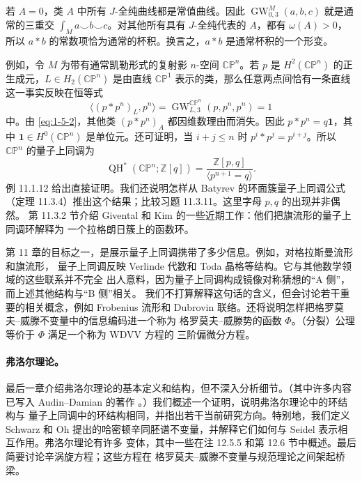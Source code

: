 若 $A=0$，类 $A$ 中所有 $J$-全纯曲线都是常值曲线。因此
$\operatorname{GW}_{0,3}^M(a,b,c)$ 就是通常的三重交
$\int_M a\smile b\smile c$。对其他所有具有 $J$-全纯代表的 $A$，都有 $\omega(A)>0$，
所以 $a*b$ 的常数项恰为通常的杯积。换言之，$a*b$ 是通常杯积的一个形变。

例如，令 $M$ 为带有通常凯勒形式的复射影 $n$-空间 $\mathbb{CP}^n$。若 $p$ 是
$H^2(\mathbb{CP}^n)$ 的正生成元，$L\in H_2(\mathbb{CP}^n)$ 是由直线
$\mathbb{CP}^1$ 表示的类，那么任意两点间恰有一条直线这一事实反映在恒等式
\[
  \bigl\langle(p*p^n)_L,p^n\bigr\rangle
  =\operatorname{GW}_{L,3}^{\mathbb{CP}^n}(p,p^n,p^n)=1
\]
中。由 \eqref{eq:1-5-2}，其他类 $(p*p^n)_A$ 都因维数理由而消失。因此
$p*p^n=q\mathbf1$，其中 $\mathbf1\in H^0(\mathbb{CP}^n)$ 是单位元。还可证明，当
$i+j\le n$ 时 $p^i*p^j=p^{i+j}$。所以 $\mathbb{CP}^n$ 的量子上同调为
\[
  \operatorname{QH}^*(\mathbb{CP}^n;\mathbb Z[q])
  =\frac{\mathbb Z[p,q]}{\langle p^{n+1}=q\rangle}.
\]
例 11.1.12 给出直接证明。我们还说明怎样从 Batyrev 的环面簇量子上同调公式
（定理 11.3.4）推出这个结果；比较习题 11.3.11。这里字母 $p,q$ 的出现并非偶然。
第 11.3.2 节介绍 Givental 和 Kim 的一些近期工作：他们把旗流形的量子上同调环解释为
一个拉格朗日簇上的函数环。

第 11 章的目标之一，是展示量子上同调携带了多少信息。例如，对格拉斯曼流形和旗流形，
量子上同调反映 Verlinde 代数和 Toda 晶格等结构。它与其他数学领域的这些联系并不完全
出人意料，因为量子上同调构成镜像对称猜想的“A 侧”，而上述其他结构与“B 侧”相关。
我们不打算解释这句话的含义，但会讨论若干重要的相关概念，例如 Frobenius 流形和
Dubrovin 联络。还将说明怎样把格罗莫夫--威滕不变量中的信息编码进一个称为
格罗莫夫--威滕势的函数 $\Phi$。（分裂）公理等价于 $\Phi$ 满足一个称为 WDVV 方程的
三阶偏微分方程。

\paragraph{弗洛尔理论。}
最后一章介绍弗洛尔理论的基本定义和结构，但不深入分析细节。（其中许多内容已写入
Audin--Damian 的著作 。）我们概述一个证明，说明弗洛尔理论中的环结构与
量子上同调中的环结构相同，并指出若干当前研究方向。特别地，我们定义 Schwarz 和 Oh
提出的哈密顿辛同胚谱不变量，并解释它们如何与 Seidel 表示相互作用。弗洛尔理论有许多
变体，其中一些在注 12.5.5 和第 12.6 节中概述。最后简要讨论辛涡旋方程；这些方程在
格罗莫夫--威滕不变量与规范理论之间架起桥梁。

